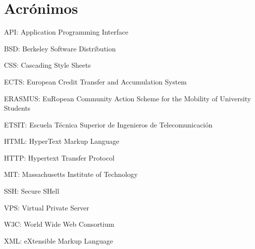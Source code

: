 \documentclass[a4paper, 12pt]{book}
\begin{document}
\chapter*{Acrónimos}
API: Application Programming Interface

BSD: Berkeley Software Distribution

CSS: Cascading Style Sheets

ECTS: European Credit Transfer and Accumulation System

ERASMUS: EuRopean Community Action Scheme for the Mobility of University Students

ETSIT: Escuela Técnica Superior de Ingenieros de Telecomunicación

HTML: HyperText Markup Language

HTTP: Hypertext Transfer Protocol

MIT: Massachusetts Institute of Technology

SSH: Secure SHell

VPS: Virtual Private Server

W3C: World Wide Web Consortium

XML: eXtensible Markup Language




\tableofcontents 
\cleardoublepage
{} %
\listoffigures %


\end{document}
